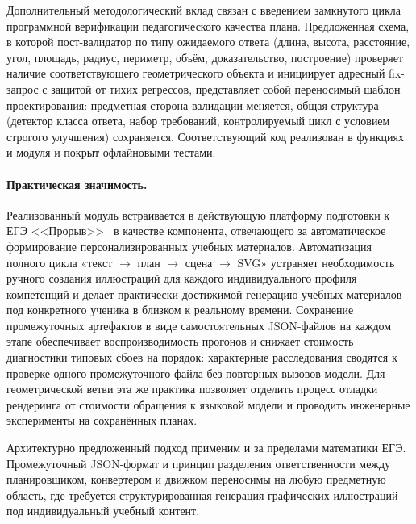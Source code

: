 Дополнительный методологический вклад связан с введением замкнутого
цикла программной верификации педагогического качества плана. Предложенная
схема, в которой пост\nobreakdash-валидатор по типу ожидаемого ответа
(длина, высота, расстояние, угол, площадь, радиус, периметр, объём,
доказательство, построение) проверяет наличие соответствующего
геометрического объекта и инициирует адресный fix\nobreakdash-запрос
с защитой от тихих регрессов, представляет собой переносимый шаблон
проектирования: предметная сторона валидации меняется, общая структура
(детектор класса ответа, набор требований, контролируемый цикл с условием
строгого улучшения) сохраняется. Соответствующий код реализован в
функциях  и
 модуля 
и покрыт офлайновыми тестами.

\paragraph{Практическая значимость.}
Реализованный модуль встраивается в действующую платформу подготовки
к ЕГЭ <<Прорыв>>~\cite{Proriv} в качестве компонента, отвечающего за
автоматическое формирование персонализированных учебных материалов.
Автоматизация полного цикла «текст \(\to\) план \(\to\) сцена \(\to\) SVG»
устраняет необходимость ручного создания иллюстраций для каждого
индивидуального профиля компетенций и делает практически достижимой
генерацию учебных материалов под конкретного ученика в близком к реальному
времени. Сохранение промежуточных артефактов в виде самостоятельных
JSON\nobreakdash-файлов на каждом этапе обеспечивает воспроизводимость
прогонов и снижает стоимость диагностики типовых сбоев на порядок:
характерные расследования сводятся к проверке одного промежуточного файла
без повторных вызовов модели. Для геометрической ветви эта же практика
позволяет отделить процесс отладки рендеринга от стоимости обращения к
языковой модели и проводить инженерные эксперименты на сохранённых планах.

Архитектурно предложенный подход применим и за пределами математики ЕГЭ.
Промежуточный JSON\nobreakdash-формат и принцип разделения ответственности
между планировщиком, конвертером и движком переносимы на любую предметную
область, где требуется структурированная генерация графических иллюстраций
под индивидуальный учебный контент.

